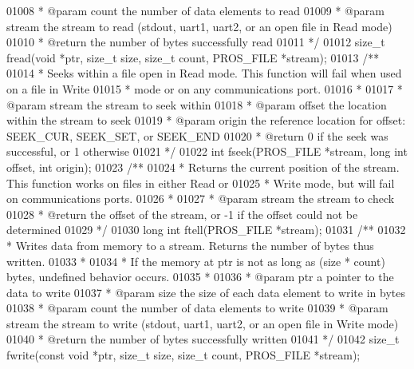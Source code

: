 \begin{DoxyCode}
01008 \textcolor{comment}{ * @param count the number of data elements to read}
01009 \textcolor{comment}{ * @param stream the stream to read (stdout, uart1, uart2, or an open file in Read mode)}
01010 \textcolor{comment}{ * @return the number of bytes successfully read}
01011 \textcolor{comment}{ */}
01012 size\_t fread(\textcolor{keywordtype}{void} *ptr, size\_t size, size\_t count, PROS_FILE *stream);
01013 \textcolor{comment}{/**}
01014 \textcolor{comment}{ * Seeks within a file open in Read mode. This function will fail when used on a file in Write}
01015 \textcolor{comment}{ * mode or on any communications port.}
01016 \textcolor{comment}{ *}
01017 \textcolor{comment}{ * @param stream the stream to seek within}
01018 \textcolor{comment}{ * @param offset the location within the stream to seek}
01019 \textcolor{comment}{ * @param origin the reference location for offset: SEEK\_CUR, SEEK\_SET, or SEEK\_END}
01020 \textcolor{comment}{ * @return 0 if the seek was successful, or 1 otherwise}
01021 \textcolor{comment}{ */}
01022 \textcolor{keywordtype}{int} fseek(PROS_FILE *stream, \textcolor{keywordtype}{long} \textcolor{keywordtype}{int} offset, \textcolor{keywordtype}{int} origin);
01023 \textcolor{comment}{/**}
01024 \textcolor{comment}{ * Returns the current position of the stream. This function works on files in either Read or}
01025 \textcolor{comment}{ * Write mode, but will fail on communications ports.}
01026 \textcolor{comment}{ *}
01027 \textcolor{comment}{ * @param stream the stream to check}
01028 \textcolor{comment}{ * @return the offset of the stream, or -1 if the offset could not be determined}
01029 \textcolor{comment}{ */}
01030 \textcolor{keywordtype}{long} \textcolor{keywordtype}{int} ftell(PROS_FILE *stream);
01031 \textcolor{comment}{/**}
01032 \textcolor{comment}{ * Writes data from memory to a stream. Returns the number of bytes thus written.}
01033 \textcolor{comment}{ *}
01034 \textcolor{comment}{ * If the memory at ptr is not as long as (size * count) bytes, undefined behavior occurs.}
01035 \textcolor{comment}{ *}
01036 \textcolor{comment}{ * @param ptr a pointer to the data to write}
01037 \textcolor{comment}{ * @param size the size of each data element to write in bytes}
01038 \textcolor{comment}{ * @param count the number of data elements to write}
01039 \textcolor{comment}{ * @param stream the stream to write (stdout, uart1, uart2, or an open file in Write mode)}
01040 \textcolor{comment}{ * @return the number of bytes successfully written}
01041 \textcolor{comment}{ */}
01042 size\_t fwrite(\textcolor{keyword}{const} \textcolor{keywordtype}{void} *ptr, size\_t size, size\_t count, PROS_FILE *stream);

\end{DoxyCode}
